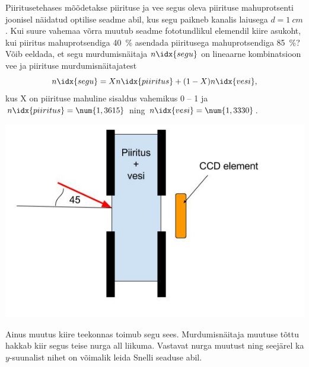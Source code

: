 
Piiritusetehases mõõdetakse piirituse ja vee segus oleva piirituse mahuprotsenti joonisel näidatud optilise seadme abil, kus segu paikneb kanalis laiusega $d=\SI{1}{cm}$. 
Kui suure vahemaa võrra muutub seadme fototundlikul elemendil kiire asukoht, kui piiritus mahuprotsendiga \SI{40}{\percent} asendada piiritusega mahuprotsendiga \SI{85}{\percent}?
Võib eeldada, et segu murdumisnäitaja $n\idx{segu}$ on lineaarne kombinatsioon vee ja piirituse murdumisnäitajatest
$$
n\idx{segu}=Xn\idx{piiritus}+(1-X)n\idx{vesi},
$$
kus X on piirituse mahuline sisaldus vahemikus 0 -- 1 ja $n\idx{piiritus}=\num{1,3615}$ ning $n\idx{vesi}=\num{1,3330}$.

\begin{center}
	\vspace{-0pt}
	\includegraphics[width=0.5\linewidth]{2017-v2g-04-Piiritusetehas.jpg}
	\vspace{-10pt}
\end{center}

\hint
Ainus muutus kiire teekonnas toimub segu sees. Murdumisnäitaja muutuse tõttu hakkab kiir segus teise nurga all liikuma. Vastavat nurga muutust ning seejärel ka $y$-suunalist nihet on võimalik leida Snelli seaduse abil.

